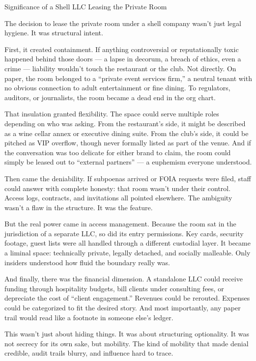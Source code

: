 \begin{TechnicalSidebar}{Significance of a Shell LLC Leasing the Private Room}

  The decision to lease the private room under a shell company wasn’t just legal 
  hygiene. It was structural intent.

  \medskip
  
  First, it created containment. If anything controversial or reputationally toxic happened behind those doors — 
  a lapse in decorum, a breach of ethics, even a crime — liability wouldn’t touch the restaurant or the club. Not 
  directly. On paper, the room belonged to a “private event services firm,” a neutral tenant with no obvious 
  connection to adult entertainment or fine dining. To regulators, auditors, or journalists, the room became a 
  dead end in the org chart.

  \medskip
  
  That insulation granted flexibility. The space could serve multiple roles depending on who was asking. From the 
  restaurant’s side, it might be described as a wine cellar annex or executive dining suite. From the club’s side, 
  it could be pitched as VIP overflow, though never formally listed as part of the venue. And if the conversation 
  was too delicate for either brand to claim, the room could simply be leased out to “external partners” — a 
  euphemism everyone understood.

  \medskip
  
  Then came the deniability. If subpoenas arrived or FOIA requests were filed, staff could answer with complete 
  honesty: that room wasn’t under their control. Access logs, contracts, and invitations all pointed elsewhere. 
  The ambiguity wasn’t a flaw in the structure. It was the feature.

  \medskip
  
  But the real power came in access management. Because the room sat in the jurisdiction of a separate LLC, so 
  did its entry permissions. Key cards, security footage, guest lists were all handled through a different custodial 
  layer. It became a liminal space: technically private, legally detached, and socially malleable. Only insiders 
  understood how fluid the boundary really was.

  \medskip
  
  And finally, there was the financial dimension. A standalone LLC could receive funding through hospitality budgets, 
  bill clients under consulting fees, or depreciate the cost of “client engagement.” Revenues could be rerouted. 
  Expenses could be categorized to fit the desired story. And most importantly, any paper trail would read like a 
  footnote in someone else’s ledger.

  \medskip
  
  This wasn’t just about hiding things. It was about structuring optionality. It was not secrecy for its own sake, 
  but mobility. The kind of mobility that made denial credible, audit trails blurry, and influence hard to trace.
  
\end{TechnicalSidebar}

